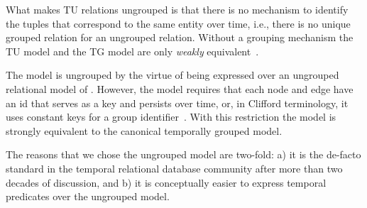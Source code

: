 
What makes TU relations ungrouped is that there is no mechanism to
identify the tuples that correspond to the same entity over time,
i.e., there is no unique grouped relation for an ungrouped relation.
Without a grouping mechanism the TU model and the TG model are only
{\em weakly} equivalent~\cite{Clifford1994}.

The \tg model is ungrouped by the virtue of being expressed over an
ungrouped relational model of \tra.  However, the \tg model requires
that each node and edge have an id that serves as a key and persists
over time, or, in Clifford terminology, it uses constant keys for a
group identifier~\cite{Clifford1994}.  With this restriction the \tga
model is strongly equivalent to the canonical temporally grouped model.

The reasons that we chose the ungrouped model are two-fold: a) it is
the de-facto standard in the temporal relational database community
after more than two decades of discussion, and b) it is conceptually
easier to express temporal predicates over the ungrouped model.

